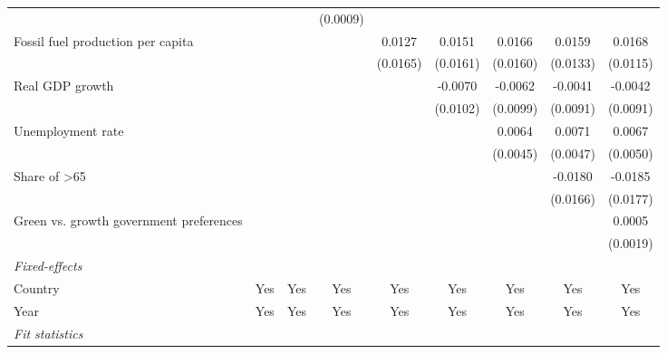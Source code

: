 \begin{table}[htbp]
\begin{tabular}{lcccccccc}
                                              &                 &                 & (0.0009) &          &          &          &          &   \\   
      Fossil fuel production per capita       &                 &                 &          & 0.0127   & 0.0151   & 0.0166   & 0.0159   & 0.0168\\   
                                              &                 &                 &          & (0.0165) & (0.0161) & (0.0160) & (0.0133) & (0.0115)\\   
      Real GDP growth                         &                 &                 &          &          & -0.0070  & -0.0062  & -0.0041  & -0.0042\\   
                                              &                 &                 &          &          & (0.0102) & (0.0099) & (0.0091) & (0.0091)\\   
      Unemployment rate                       &                 &                 &          &          &          & 0.0064   & 0.0071   & 0.0067\\   
                                              &                 &                 &          &          &          & (0.0045) & (0.0047) & (0.0050)\\   
      Share of >65                            &                 &                 &          &          &          &          & -0.0180  & -0.0185\\   
                                              &                 &                 &          &          &          &          & (0.0166) & (0.0177)\\   
      Green vs. growth government preferences &                 &                 &          &          &          &          &          & 0.0005\\   
                                              &                 &                 &          &          &          &          &          & (0.0019)\\   
      \midrule
      \emph{Fixed-effects}\\
      Country                                 & Yes             & Yes             & Yes      & Yes      & Yes      & Yes      & Yes      & Yes\\  
      Year                                    & Yes             & Yes             & Yes      & Yes      & Yes      & Yes      & Yes      & Yes\\  
      \midrule
      \emph{Fit statistics}\\

\end{tabular}
\end{table}
